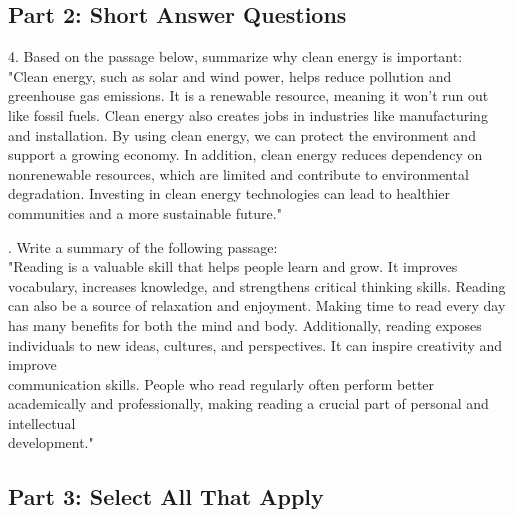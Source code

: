 \documentclass[12pt]{article}
\begin{document}
\vspace{1cm}


\subsection*{Part 2: Short Answer Questions}

4. Based on the passage below, summarize why clean energy is important: \\
"Clean energy, such as solar and wind power, helps reduce pollution and greenhouse gas emissions. It is a renewable resource, meaning it won’t run out like fossil fuels. Clean energy also creates jobs in industries like manufacturing and installation. By using clean energy, we can protect the environment and support a growing economy. In addition, clean energy reduces dependency on nonrenewable resources, which are limited and contribute to environmental degradation. Investing in clean energy technologies can lead to healthier communities and a more sustainable future."\\
\vspace{4cm}

. Write a summary of the following passage: \\
"Reading is a valuable skill that helps people learn and grow. It improves vocabulary, increases knowledge, and strengthens critical thinking skills. Reading can also be a source of relaxation and enjoyment. Making time to read every day has many benefits for both the mind and body. Additionally, reading exposes individuals to new ideas, cultures, and perspectives. It can inspire creativity and improve \\communication skills. People who read regularly often perform better academically and professionally, making reading a crucial part of personal and intellectual \\development."\\
\vspace{6cm}

\subsection*{Part 3: Select All That Apply}
\end{document}
